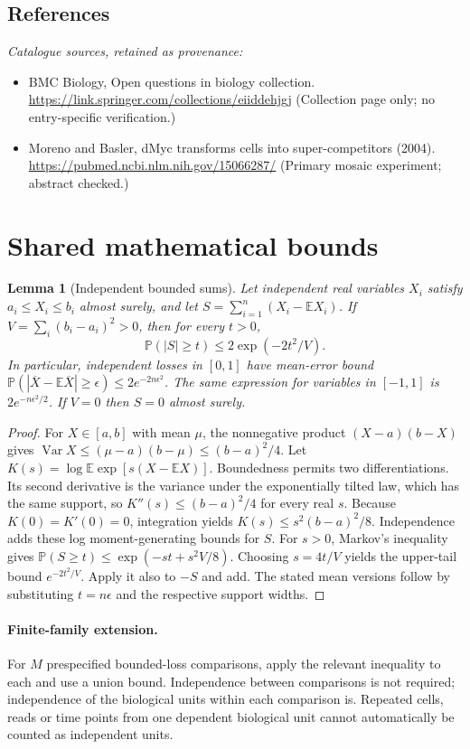 \documentclass[11pt]{article}
\newcommand{\E}{\mathbb E}
\newcommand{\Prob}{\mathbb P}
\DeclareMathOperator{\Var}{Var}
\providecommand{\E}{\mathbb E}
\providecommand{\Prob}{\mathbb P}
\providecommand{\Var}{\operatorname{Var}}
\newtheorem{sharedlemma}{Lemma}[section]
\begin{document}
\subsection{References}
\noindent\emph{Catalogue sources, retained as provenance:}
\begin{itemize}
\item BMC Biology, Open questions in biology collection. \url{https://link.springer.com/collections/eiiddehjgj} (Collection page only; no entry-specific verification.)
\item Moreno and Basler, dMyc transforms cells into super-competitors (2004). \url{https://pubmed.ncbi.nlm.nih.gov/15066287/} (Primary mosaic experiment; abstract checked.)
\end{itemize}
\clearpage


\appendix
\section{Shared mathematical bounds}\label{app:bounds}
\begin{sharedlemma}[Independent bounded sums]\label{lem:bounded}
Let independent real variables $X_i$ satisfy $a_i\leq X_i\leq b_i$ almost surely,
and let $S=\sum_{i=1}^n(X_i-\E X_i)$. If
$V=\sum_i(b_i-a_i)^2>0$, then for every $t>0$,
\[
 \Prob(|S|\geq t)\leq 2\exp(-2t^2/V).
\]
In particular, independent losses in $[0,1]$ have mean-error bound
$\Prob(|\overline X-\E\overline X|\geq\epsilon)
\leq2e^{-2n\epsilon^2}$. The same expression for variables in $[-1,1]$
is $2e^{-n\epsilon^2/2}$. If $V=0$ then $S=0$ almost surely.
\end{sharedlemma}
\begin{proof}
For $X\in[a,b]$ with mean $\mu$, the nonnegative product
$(X-a)(b-X)$ gives
$\Var X\leq(\mu-a)(b-\mu)\leq(b-a)^2/4$.
Let $K(s)=\log\E\exp[s(X-\E X)]$.
Boundedness permits two differentiations. Its second derivative is the variance
under the exponentially tilted law, which has the same support, so
$K''(s)\leq(b-a)^2/4$ for every real $s$.
Because $K(0)=K'(0)=0$, integration yields
$K(s)\leq s^2(b-a)^2/8$.
Independence adds these log moment-generating bounds for $S$.
For $s>0$, Markov's inequality gives
$\Prob(S\geq t)\leq\exp(-st+s^2V/8)$.
Choosing $s=4t/V$ yields the upper-tail bound $e^{-2t^2/V}$.
Apply it also to $-S$ and add. The stated mean versions follow by substituting
$t=n\epsilon$ and the respective support widths.
\end{proof}

\paragraph{Finite-family extension.}
For $M$ prespecified bounded-loss comparisons, apply the relevant inequality to
each and use a union bound. Independence between comparisons is not required;
independence of the biological units within each comparison is. Repeated cells,
reads or time points from one dependent biological unit cannot automatically be
counted as independent units.
\end{document}
